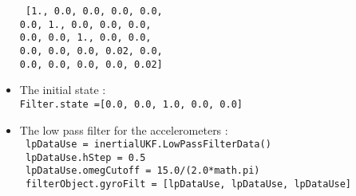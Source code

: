 \begin{itemize}
  \texttt{ [1., 0.0, 0.0, 0.0, 0.0, \\
                          0.0, 1., 0.0, 0.0, 0.0,\\
                          0.0, 0.0, 1., 0.0, 0.0,\\
                          0.0, 0.0, 0.0, 0.02, 0.0,\\
                          0.0, 0.0, 0.0, 0.0, 0.02]}
 \item The initial state :\\
 \texttt{Filter.state =[0.0, 0.0, 1.0, 0.0, 0.0]}
  \item The low pass filter for the accelerometers :\\
    \texttt{ lpDataUse = inertialUKF.LowPassFilterData()}\\
   \texttt{ lpDataUse.hStep = 0.5 }\\
 \texttt{   lpDataUse.omegCutoff = 15.0/(2.0*math.pi) }\\
 \texttt{   filterObject.gyroFilt = [lpDataUse, lpDataUse, lpDataUse] }\\
\end{itemize}



